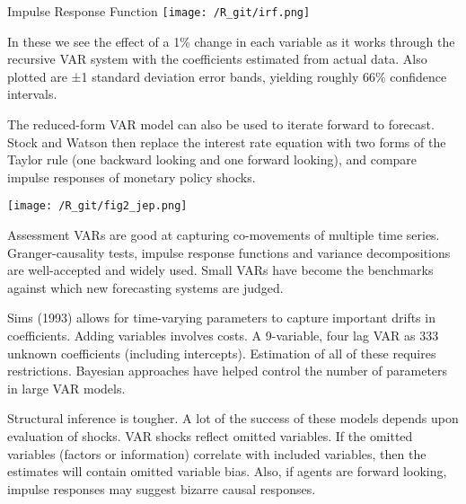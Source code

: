 \documentclass[
  ignorenonframetext,
]{beamer}
\begin{document}
\begin{frame}{Impulse Response Function}
\protect\hypertarget{impulse-response-function}{}
\texttt{[image: /R\_git/irf.png]}

In these we see the effect of a 1\% change in each variable as it works
through the recursive VAR system with the coefficients estimated from
actual data. Also plotted are ±1 standard deviation error bands,
yielding roughly 66\% confidence intervals.

The reduced-form VAR model can also be used to iterate forward to
forecast. Stock and Watson then replace the interest rate equation with
two forms of the Taylor rule (one backward looking and one forward
looking), and compare impulse responses of monetary policy shocks.
\end{frame}

\begin{frame}
\texttt{[image: /R\_git/fig2\_jep.png]}
\end{frame}

\begin{frame}{Assessment}
\protect\hypertarget{assessment}{}
VARs are good at capturing co-movements of multiple time series.
Granger-causality tests, impulse response functions and variance
decompositions are well-accepted and widely used. Small VARs have become
the benchmarks against which new forecasting systems are judged.

Sims (1993) allows for time-varying parameters to capture important
drifts in coefficients. Adding variables involves costs. A 9-variable,
four lag VAR as 333 unknown coefficients (including intercepts).
Estimation of all of these requires restrictions. Bayesian approaches
have helped control the number of parameters in large VAR models.

Structural inference is tougher. A lot of the success of these models
depends upon evaluation of shocks. VAR shocks reflect omitted variables.
If the omitted variables (factors or information) correlate with
included variables, then the estimates will contain omitted variable
bias. Also, if agents are forward looking, impulse responses may suggest
bizarre causal responses.
\end{frame}
\end{document}
